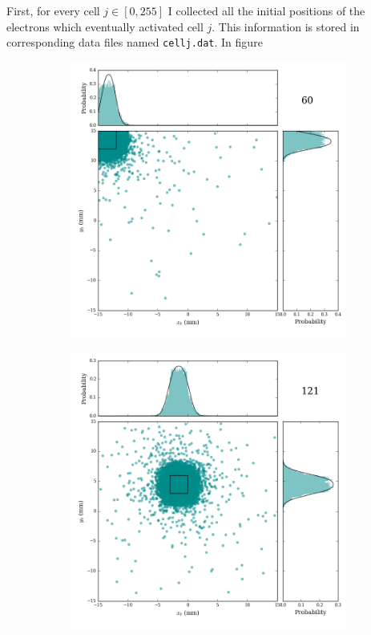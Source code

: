\documentclass[12pt]{article}
\begin{document}
\noindent First, for every cell $j \in [0,255]$ I collected all the initial positions of the electrons which eventually activated cell $j$. This information is stored in corresponding data files named \texttt{cellj.dat}. In figure

\begin{figure}
\centering
\begin{subfigure}{.5\textwidth}
  \centering
  \includegraphics[width=\linewidth]{../figures/cellfigs/cell60.png}
  \label{fig:sub1}
\end{subfigure}%
\begin{subfigure}{.5\textwidth}
  \centering
  \includegraphics[width=\linewidth]{../figures/cellfigs/cell121.png}
  \label{fig:sub2}
\end{subfigure}
\label{fig:test}


\end{figure}
\end{document}
